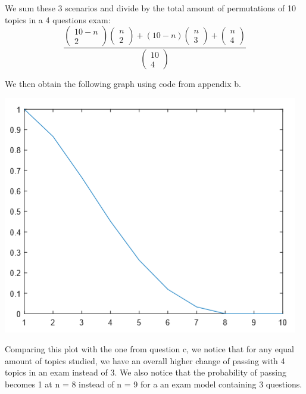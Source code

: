 \documentclass{article}
\begin{document}
We sum these 3 scenarios and divide by the total amount of permutations of 10 topics in a 4 questions
exam:
\begin{equation}
    \frac{\begin{pmatrix} 10 - n \\ 2 \end{pmatrix}\begin{pmatrix} n \\ 2 \end{pmatrix}
        + (10 - n)\begin{pmatrix} n \\ 3 \end{pmatrix} + \begin{pmatrix} n \\ 4 \end{pmatrix}}
    {\begin{pmatrix} 10 \\ 4 \end{pmatrix}}
\end{equation}

We then obtain the following graph using code from appendix b.
\begin{center}
    \includegraphics[scale=0.5]{p2}
\end{center}

Comparing this plot with the one from question c, we notice that for any equal amount
of topics studied, we have an overall higher change of passing with 4 topics in an exam
instead of 3. We also notice that the probability of passing becomes 1 at n = 8 instead of n = 9
for a an exam model containing 3 questions.
\end{document}
